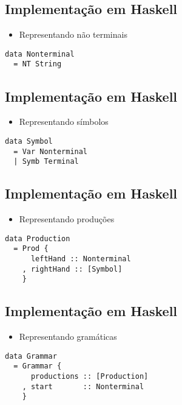 \documentclass[11pt]{article}
\begin{document}
\subsection*{Implementação em Haskell}
\label{sec:orgc526fbf}

\begin{itemize}
\item Representando não terminais
\end{itemize}

\begin{verbatim}
data Nonterminal
  = NT String
\end{verbatim}
\subsection*{Implementação em Haskell}
\label{sec:org512b8fc}

\begin{itemize}
\item Representando símbolos
\end{itemize}

\begin{verbatim}
data Symbol
  = Var Nonterminal
  | Symb Terminal
\end{verbatim}
\subsection*{Implementação em Haskell}
\label{sec:org23dadf7}

\begin{itemize}
\item Representando produções
\end{itemize}

\begin{verbatim}
data Production
  = Prod {
      leftHand :: Nonterminal
    , rightHand :: [Symbol]
    } 
\end{verbatim}
\subsection*{Implementação em Haskell}
\label{sec:orge56ccd3}

\begin{itemize}
\item Representando gramáticas
\end{itemize}

\begin{verbatim}
data Grammar
  = Grammar {
      productions :: [Production]
    , start       :: Nonterminal
    }
\end{verbatim}
\end{document}
